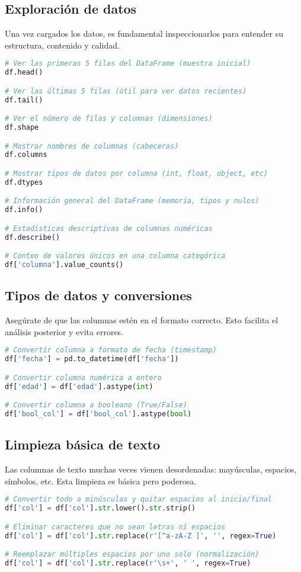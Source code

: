 \documentclass[11pt]{article}
\begin{document}
\subsection*{Exploración de datos}
Una vez cargados los datos, es fundamental inspeccionarlos para entender su estructura, contenido y calidad.

\begin{lstlisting}[language=Python]
# Ver las primeras 5 filas del DataFrame (muestra inicial)
df.head()

# Ver las últimas 5 filas (útil para ver datos recientes)
df.tail()

# Ver el número de filas y columnas (dimensiones)
df.shape

# Mostrar nombres de columnas (cabeceras)
df.columns

# Mostrar tipos de datos por columna (int, float, object, etc)
df.dtypes

# Información general del DataFrame (memoria, tipos y nulos)
df.info()

# Estadísticas descriptivas de columnas numéricas
df.describe()

# Conteo de valores únicos en una columna categórica
df['columna'].value_counts()
\end{lstlisting}

\subsection*{Tipos de datos y conversiones}
Asegúrate de que las columnas estén en el formato correcto. Esto facilita el análisis posterior y evita errores.

\begin{lstlisting}[language=Python]
# Convertir columna a formato de fecha (timestamp)
df['fecha'] = pd.to_datetime(df['fecha'])

# Convertir columna numérica a entero
df['edad'] = df['edad'].astype(int)

# Convertir columna a booleano (True/False)
df['bool_col'] = df['bool_col'].astype(bool)
\end{lstlisting}

\subsection*{Limpieza básica de texto}
Las columnas de texto muchas veces vienen desordenadas: mayúsculas, espacios, símbolos, etc. Esta limpieza es básica pero poderosa.

\begin{lstlisting}[language=Python]
# Convertir todo a minúsculas y quitar espacios al inicio/final
df['col'] = df['col'].str.lower().str.strip()

# Eliminar caracteres que no sean letras ni espacios
df['col'] = df['col'].str.replace(r'[^a-zA-Z ]', '', regex=True)

# Reemplazar múltiples espacios por uno solo (normalización)
df['col'] = df['col'].str.replace(r'\s+', ' ', regex=True)
\end{lstlisting}
\end{document}
